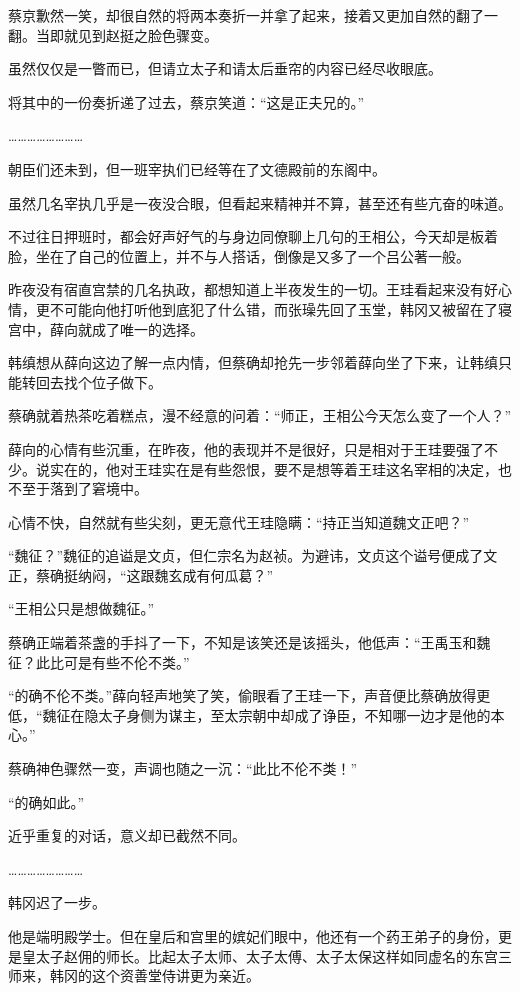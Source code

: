 蔡京歉然一笑，却很自然的将两本奏折一并拿了起来，接着又更加自然的翻了一翻。当即就见到赵挺之脸色骤变。

虽然仅仅是一瞥而已，但请立太子和请太后垂帘的内容已经尽收眼底。

将其中的一份奏折递了过去，蔡京笑道：“这是正夫兄的。”

……………………

朝臣们还未到，但一班宰执们已经等在了文德殿前的东阁中。

虽然几名宰执几乎是一夜没合眼，但看起来精神并不算，甚至还有些亢奋的味道。

不过往日押班时，都会好声好气的与身边同僚聊上几句的王相公，今天却是板着脸，坐在了自己的位置上，并不与人搭话，倒像是又多了一个吕公著一般。

昨夜没有宿直宫禁的几名执政，都想知道上半夜发生的一切。王珪看起来没有好心情，更不可能向他打听他到底犯了什么错，而张璪先回了玉堂，韩冈又被留在了寝宫中，薛向就成了唯一的选择。

韩缜想从薛向这边了解一点内情，但蔡确却抢先一步邻着薛向坐了下来，让韩缜只能转回去找个位子做下。

蔡确就着热茶吃着糕点，漫不经意的问着：“师正，王相公今天怎么变了一个人？”

薛向的心情有些沉重，在昨夜，他的表现并不是很好，只是相对于王珪要强了不少。说实在的，他对王珪实在是有些怨恨，要不是想等着王珪这名宰相的决定，也不至于落到了窘境中。

心情不快，自然就有些尖刻，更无意代王珪隐瞒：“持正当知道魏文正吧？”

“魏征？”魏征的追谥是文贞，但仁宗名为赵祯。为避讳，文贞这个谥号便成了文正，蔡确挺纳闷，“这跟魏玄成有何瓜葛？”

“王相公只是想做魏征。”

蔡确正端着茶盏的手抖了一下，不知是该笑还是该摇头，他低声：“王禹玉和魏征？此比可是有些不伦不类。”

“的确不伦不类。”薛向轻声地笑了笑，偷眼看了王珪一下，声音便比蔡确放得更低，“魏征在隐太子身侧为谋主，至太宗朝中却成了诤臣，不知哪一边才是他的本心。”

蔡确神色骤然一变，声调也随之一沉：“此比不伦不类！”

“的确如此。”

近乎重复的对话，意义却已截然不同。

……………………

韩冈迟了一步。

他是端明殿学士。但在皇后和宫里的嫔妃们眼中，他还有一个药王弟子的身份，更是皇太子赵佣的师长。比起太子太师、太子太傅、太子太保这样如同虚名的东宫三师来，韩冈的这个资善堂侍讲更为亲近。

